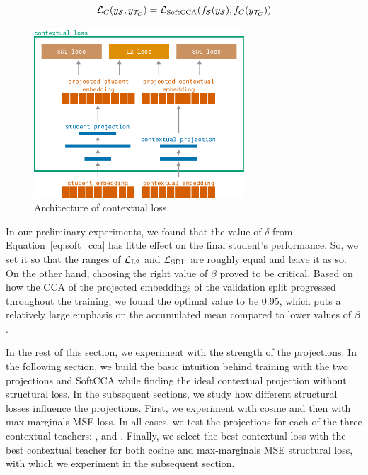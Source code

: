 \begin{equation}\label{eq:contextual_loss}
  \mathcal{L}_C(y_{\mathcal{S}}, y_{\mathcal{T}_C}) = \mathcal{L}_{\text{SoftCCA}}(
    f_{\mathcal{S}}(y_{\mathcal{S}}),
    f_C(y_{\mathcal{T}_C})
  )
\end{equation}

\begin{figure}

  \centering
  \includegraphics[width=0.7\textwidth]{img/contextual_loss.pdf}

  \caption{Architecture of contextual loss.}

  \label{fig:contextual_loss}

\end{figure}

In our preliminary experiments, we found that the value of $\delta$ from
Equation~\ref{eq:soft_cca} has little effect on the final student's
performance. So, we set it so that the ranges of $\mathcal{L}_{\text{L2}}$ and
$\mathcal{L}_{\text{SDL}}$ are roughly equal and leave it as so. On the other hand,
choosing the right value of $\beta$ proved to be critical. Based on how the CCA
of the projected embeddings of the validation split progressed throughout the
training, we found the optimal value to be 0.95, which puts a relatively large
emphasis on the accumulated mean compared to lower values of $\beta$.

In the rest of this section, we experiment with the strength of the
projections. In the following section, we build the basic intuition behind
training with the two projections and SoftCCA while finding the ideal
contextual projection without structural loss. In the subsequent sections,
we study how different structural losses influence the projections. First, we
experiment with cosine and then with max-marginals MSE loss. In all cases, we
test the projections for each of the three contextual teachers:
,  and . Finally, we select
the best contextual loss with the best contextual teacher for both cosine and
max-marginals MSE structural loss, with which we experiment in
the subsequent section.

